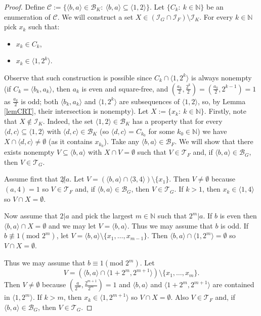 \documentclass{amsart}
\theoremstyle{definition}
\newcommand{\N}{{\mathbb N}}
\newcommand{\I}{\mathcal I}
\newcommand{\T}{\mathcal{T}}
\newcommand{\B}{\mathcal{B}}
\newcommand{\modulo}{\textrm{mod }}
\newcommand{\arithseq}[2]{\langle#2, #1\rangle}
\begin{document}
\begin{proof}
Define $\mathcal{C} := \{\arithseq{a}{b}\in \B_K :\ \arithseq{a}{b}\subseteq \arithseq{2}{1}\}$. Let $\{C_k :\ k\in\N\}$ be an enumeration of $\mathcal{C}$.
We will construct a set $X \in (\I_G\cap \I_F) \setminus \I_K$. 
For every $k\in\N$ pick $x_k$ such that:
\begin{itemize}
	\item $x_k\in C_k$,
	\item $x_k\in \arithseq{2^k}{1}$.
\end{itemize}
Observe that such construction is possible since $C_k \cap \arithseq{2^k}{1}$ is always nonempty (if $C_k = \arithseq{a_k}{b_k}$, then $a_k$ is even and square-free, and $\left(\frac{a_k}{2},\frac{2^k}{2}\right)=\left(\frac{a_k}{2},2^{k-1}\right)=1$ as $\frac{a_k}{2}$ is odd; both $\arithseq{a_k}{b_k}$ and $\arithseq{2^k}{1}$ are subsequences of $\arithseq{2}{1}$, so, by Lemma \ref{lemCRT}, their intersection is nonempty). Let $X := \{x_k :\ k\in\N\}$.
Firstly, note that $X \notin \I_K$. Indeed, the set $\arithseq{2}{1}\in\B_K$ has a property that for every $\arithseq{c}{d}\subseteq \arithseq{2}{1}$ with $\arithseq{c}{d}\in \B_K$ (so $\arithseq{c}{d}=C_{k_0}$ for some $k_0\in\N$) we have $X\cap \arithseq{c}{d} \neq \emptyset$ (as it contains $x_{k_0}$).
  Take any $\arithseq{a}{b} \in \B_F$. We will show that there exists
nonempty $V \subseteq \arithseq{a}{b}$ with $X\cap V = \emptyset$ such
that $V\in \T_F$ and, if $\arithseq{a}{b}\in \B_G$, then $V\in\T_G$.

  Assume first that $2\not | a$. Let 
$V = (\arithseq{a}{b} \cap \arithseq{4}{3}) \setminus \{x_1\}$. 
Then $V \not= \emptyset$ because $(a,4) = 1$ so 
$V\in \T_F$ and, if $\arithseq{a}{b}\in \B_G$, then $V\in \T_G$.
If $k > 1$, then $x_k \in \arithseq{4}{1}$ so $V\cap X = \emptyset$.
  
  Now assume that $2|a$ and pick the largest $m\in \N$
such that $2^m|a$. If $b$ is even then $\arithseq{a}{b}\cap X = \emptyset$
and we may let $V = \arithseq{a}{b}$. Thus we may assume
that $b$ is odd. If $b\not\equiv 1(\modulo 2^m)$, let
$V = \arithseq{a}{b}\setminus \{x_1,\ldots, x_{m-1}\}$.
Then $\arithseq{a}{b}\cap \arithseq{2^m}{1} = \emptyset$ so $V\cap X = \emptyset$.

  Thus we may assume that $b\equiv 1(\modulo 2^m)$. Let 
\[
V = (\arithseq{a}{b} \cap \arithseq{2^{m+1}}{1 + 2^m}) \setminus \{x_1,\ldots, x_{m}\}.
\]
Then $V \not= \emptyset$ because $(\frac{a}{2^m} , \frac{2^{m+1}}{2^m}) = 1$
and $\arithseq{a}{b}$ and $\arithseq{2^{m+1}}{1 + 2^m}$
are contained in $\arithseq{2^m}{1}$. 
If $k > m$, then $x_k \in \arithseq{2^{m+1}}{1}$ so 
$V\cap X = \emptyset$. Also $V\in\T_F$ and, if $\arithseq{a}{b} \in \B_G$, then
$V \in \T_G$.


\end{proof}
\end{document}
